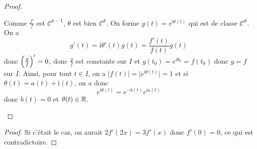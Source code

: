 \documentclass[12pt]{article}
\begin{document}
\begin{proof}
\begin{enumerate}
		Comme $\frac{f'}{f}$ est $\mathcal{C}^{k-1}$, $\theta$ est bien $\mathcal{C}^{k}$. On forme $g(t)=e^{\mathrm{i}\theta(t)}$ qui est de classe $\mathcal{C}^{k}$. On a 
		\begin{equation}g'(t)=\mathrm{i}\theta'(t)g(t)=\frac{f'(t)}{f(t)}g(t)\end{equation}
		donc $\Bigl(\frac{g}{f}\Bigr)'=0$, donc $\frac{g}{f}$ est constante sur $I$ et $g(t_{0})=e^{\mathrm{i}\theta_{0}}=f(t_{0})$ donc $g=f$ sur $I$. Ainsi, pour tout $t\in I$, on a $\vert f(t)\vert=\vert e^{\mathrm{i}\theta(t)}\vert=1$ et si $\theta(t)=a(t)+\mathrm{i}(t)$, on a donc 
		\begin{equation}e^{\mathrm{i}\theta(t)}=e^{-b(t)}e^{\mathrm{i}a(t)}\end{equation}
		donc $b(t)=0$ et $\theta(t)\in\mathbb{R}$.
	\end{enumerate}
\end{proof}

\begin{proof}
	Si c'était le cas, on aurait $2f'(2x)=3f'(x)$ donc $f'(0)=0$, ce qui est contradictoire.
\end{proof}
\end{document}
